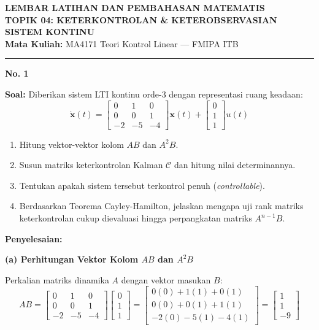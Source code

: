 \documentclass[11pt,a4paper]{article}
\begin{document}
\begin{center}
    {\Large \textbf{LEMBAR LATIHAN DAN PEMBAHASAN MATEMATIS}}\\[4pt]
    {\large \textbf{TOPIK 04: KETERKONTROLAN \& KETEROBSERVASIAN SISTEM KONTINU}}\\[4pt]
    \textbf{Mata Kuliah:} MA4171 Teori Kontrol Linear --- FMIPA ITB
\end{center}
\hrule
\vspace{10pt}

\textbf{\large No. 1}

\textbf{Soal:}  
Diberikan sistem LTI kontinu orde-3 dengan representasi ruang keadaan:
$$\dot{\mathbf{x}}(t) = \begin{bmatrix} 0 & 1 & 0 \\ 0 & 0 & 1 \\ -2 & -5 & -4 \end{bmatrix} \mathbf{x}(t) + \begin{bmatrix} 0 \\ 1 \\ 1 \end{bmatrix} u(t)$$
\begin{enumerate}[label=(\alph*)]
    \item Hitung vektor-vektor kolom $AB$ dan $A^2 B$.
    \item Susun matriks keterkontrolan Kalman $\mathcal{C}$ dan hitung nilai determinannya.
    \item Tentukan apakah sistem tersebut terkontrol penuh (\textit{controllable}).
    \item Berdasarkan Teorema Cayley-Hamilton, jelaskan mengapa uji rank matriks keterkontrolan cukup dievaluasi hingga perpangkatan matriks $A^{n-1} B$.
\end{enumerate}

\textbf{Penyelesaian:}

\textbf{(a) Perhitungan Vektor Kolom $AB$ dan $A^2 B$}

Perkalian matriks dinamika $A$ dengan vektor masukan $B$:
$$AB = \begin{bmatrix} 0 & 1 & 0 \\ 0 & 0 & 1 \\ -2 & -5 & -4 \end{bmatrix} \begin{bmatrix} 0 \\ 1 \\ 1 \end{bmatrix} = \begin{bmatrix} 0(0) + 1(1) + 0(1) \\ 0(0) + 0(1) + 1(1) \\ -2(0) - 5(1) - 4(1) \end{bmatrix} = \begin{bmatrix} 1 \\ 1 \\ -9 \end{bmatrix}$$
\end{document}
